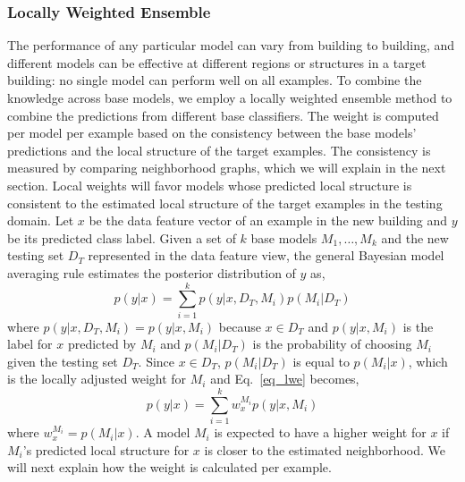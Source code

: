 \subsubsection{Locally Weighted Ensemble}
The performance of any particular model can vary from building to building, and different models can be effective at different regions or structures in a target building: no single model can perform well on all examples.
To combine the knowledge across base models,
we employ a locally weighted ensemble method \cite{lwe} to combine the predictions from different base classifiers.
The weight is computed per model per example based on the consistency between the base models' predictions and the local structure of the target examples.
The consistency is measured by comparing neighborhood graphs, which we will explain in the next section.
Local weights will favor models whose predicted local structure is consistent to the estimated local structure of the target examples in the testing domain.
Let $x$ be the data feature vector of an example in the new building and $y$ be its predicted class label. Given a set of $k$ base models $M_1, \dots, M_k$ and the new testing set $D_T$ represented in the data feature view, the general Bayesian model averaging rule estimates the posterior distribution of $y$ as,
\begin{equation}\label{eq_lwe}
p(y|x)=\sum_{i=1}^k p(y|x,D_T,M_i) p(M_i|D_T)
\end{equation}
where $p(y|x,D_T,M_i) = p(y|x,M_i)$ because $x \in D_T$ and $p(y|x,M_i)$ is the label for $x$ predicted by $M_i$ and $p(M_i|D_T)$ is the probability of choosing $M_i$ given the testing set $D_T$.
Since $x \in D_T$, $p(M_i|D_T)$ is equal to $p(M_i|x)$, which is the locally adjusted weight for $M_i$ and Eq.~\ref{eq_lwe} becomes,
\begin{equation}\label{eq_sum}
p(y|x)=\sum_{i=1}^k w_{x}^{M_i} p(y|x, M_i)
\end{equation}
where $w_{x}^{M_i} = p(M_i|x)$.  A model $M_i$ is expected to have a higher weight for $x$ if $M_i$'s predicted local structure for $x$ is closer to the estimated neighborhood.
We will next explain how the weight is calculated per example.

